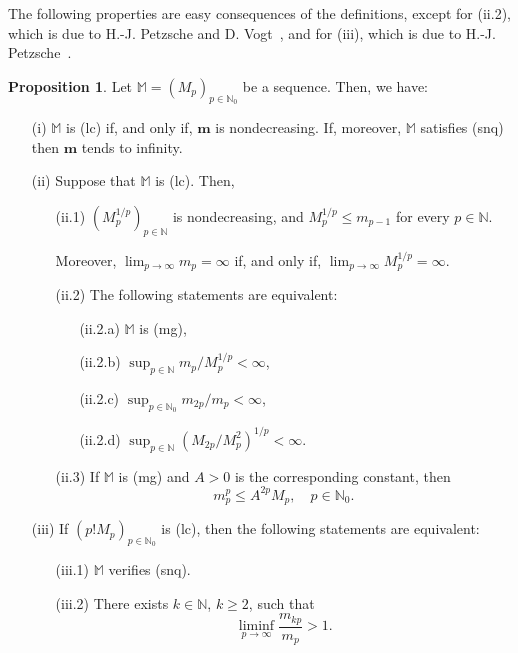 \documentclass[11pt,a4paper]{article}
\theoremstyle{definition}
\newtheorem{pro}[theo]{Proposition}
\newenvironment{prop}{\smallskip\begin{pro}}{\end{pro}\smallskip}
\def\oo{\infty}
\def\ri{\rightarrow}
\def\N{\mathbb{N}}
\def\M{\mathbb{M}}
\def\bm{\boldsymbol{m}}
\begin{document}
The following properties are easy consequences of the definitions, except for (ii.2),
which is due to H.-J. Petzsche and D. Vogt~\cite[Lemma\ 5.3]{petvog}, and for (iii), which is due to H.-J. Petzsche~\cite[Prop.\ 1.1]{Pet}.

\begin{prop}\label{propPropiedlcmg}
Let $\M=(M_p)_{p\in\N_0}$ be a sequence. Then, we have:
\begin{itemize}
\item[(i)] $\M$ is (lc) if, and only if, $\bm$ is nondecreasing. If, moreover, $\M$ satisfies (snq) then $\bm$ tends to infinity.
\item[(ii)] Suppose that $\M$ is (lc). Then,
\begin{itemize}
\item[(ii.1)]  $(M_p^{1/p})_{p\in\N}$ is nondecreasing, and $M_p^{1/p}\leq m_{p-1}$ for every $p\in\N$.\par
    Moreover, $\lim_{p\to\infty}m_p=\infty$ if, and only if, $\lim_{p\to\infty}M_p^{1/p}=\infty$.

\item[(ii.2)] The following statements are equivalent:
\begin{itemize}
  \item[(ii.2.a)]  $\M$ is (mg),
  \item[(ii.2.b)] $\sup_{p\in\N} m_p/M^{1/p}_p <\infty$,
  \item[(ii.2.c)]  $\sup_{p\in\N_0} m_{2p}/m_{p}<\infty$,
  \item[(ii.2.d)] $\sup_{p\in\N} \left(M_{2p}/M_p^2\right)^{1/p}<\infty$.
 \end{itemize}
\item[(ii.3)] If  $\M$ is (mg) and $A>0$ is the corresponding constant, then
\begin{equation*}
m_p^p\le A^{2p}M_p,\quad p\in\N_0.
\end{equation*}
\end{itemize}
\item[(iii)] If $(p!M_p)_{p\in\N_0}$ is (lc), then
 the following statements are equivalent:
 \begin{itemize}
 \item[(iii.1)] $\M$ verifies (snq).
 \item[(iii.2)] There exists $k\in\N$, $k\ge 2$, such that
 \begin{equation*}
  \liminf_{p\ri\oo} \frac{m_{kp}}{m_p}>1.
 \end{equation*}
 \end{itemize}
\end{itemize}
\end{prop}
\end{document}
